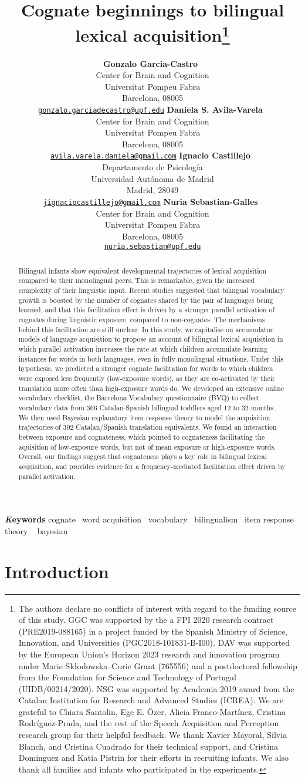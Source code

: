 \documentclass[
]{article}
\title{Cognate beginnings to bilingual lexical acquisition\thanks{The
authors declare no conflicts of interest with regard to the funding
source of this study. GGC was supported by the a FPI 2020 research
contract (PRE2019-088165) in a project funded by the Spanish Ministry of
Science, Innovation, and Universities (PGC2018-101831-B-I00). DAV was
supported by the European Union's Horizon 2023 research and innovation
program under Marie Skłodowska--Curie Grant (765556) and a postdoctoral
fellowship from the Foundation for Science and Technology of Portugal
(UIDB/00214/2020). NSG was supported by Academia 2019 award from the
Catalan Institution for Research and Advanced Studies (ICREA). We are
grateful to Chiara Santolin, Ege E. Özer, Alicia Franco-Martínez,
Cristina Rodríguez-Prada, and the rest of the Speech Acquisition and
Perception research group for their helpful feedback. We thank Xavier
Mayoral, Silvia Blanch, and Cristina Cuadrado for their technical
support, and Cristina Dominguez and Katia Pistrin for their efforts in
recruiting infants. We also thank all families and infants who
participated in the experiments.}}
\author{
\textbf{Gonzalo Garcia-Castro}~\orcidlink{0000-0002-8553-4209}\\Center
for Brain and Cognition\\Universitat Pompeu Fabra\\Barcelona,
08005\\\texttt{\href{mailto:gonzalo.garciadecastro@upf.edu}{gonzalo.garciadecastro@upf.edu}}\And
\textbf{Daniela S. Avila-Varela}~\orcidlink{0000-0002-3518-8117}\\Center
for Brain and Cognition\\Universitat Pompeu Fabra\\Barcelona,
08005\\\texttt{\href{mailto:avila.varela.daniela@gmail.com}{avila.varela.daniela@gmail.com}}\And
\textbf{Ignacio
Castillejo}~\orcidlink{0000-0001-7445-0416}\\Departamento de
Psicología\\Universidad Autónoma de Madrid\\Madrid,
28049\\\texttt{\href{mailto:jignaciocastillejo@gmail.com}{jignaciocastillejo@gmail.com}}\And
\textbf{Nuria Sebastian-Galles}~\orcidlink{0000-0001-6938-2498}\\Center
for Brain and Cognition\\Universitat Pompeu Fabra\\Barcelona,
08005\\\texttt{\href{mailto:nuria.sebastian@upf.edu}{nuria.sebastian@upf.edu}}}
\date{}
\begin{document}
\maketitle
\begin{abstract}
Bilingual infants show equivalent developmental trajectories of lexical
acquisition compared to their monolingual peers. This is remarkable,
given the increased complexity of their linguistic input. Recent studies
suggested that bilingual vocabulary growth is boosted by the number of
cognates shared by the pair of languages being learned, and that this
facilitation effect is driven by a stronger parallel activation of
cognates during linguistic exposure, compared to non-cognates. The
mechanisms behind this facilitation are still unclear. In this study, we
capitalise on accumulator models of language acquisition to propose an
account of bilingual lexical acquisition in which parallel activation
increases the rate at which children accumulate learning instances for
words in both languages, even in fully monolingual situations. Under
this hypothesis, we predicted a stronger cognate facilitation for words
to which children were exposed less frequently (low-exposure words), as
they are co-activated by their translation more often than high-exposure
words do. We developed an extensive online vocabulary checklist, the
Barcelona Vocabulary questionnaire (BVQ) to collect vocabulary data from
366 Catalan-Spanish bilingual toddlers aged 12 to 32 months. We then
used Bayesian explanatory item response theory to model the acquisition
trajectories of 302 Catalan/Spanish translation equivalents. We found an
interaction between exposure and cognateness, which pointed to
cognateness facilitating the aquisition of low-exposure words, but not
of mean exposure or high-exposure words. Overall, our findings suggest
that cognateness plays a key role in bilingual lexical acquisition, and
provides evidence for a frequency-mediated facilitation effect driven by
parallel activation.
\end{abstract}
{\bfseries \emph Keywords}
\def\sep{\textbullet\ }
cognate \sep word
acquisition \sep vocabulary \sep bilingualism \sep item response
theory \sep 
bayesian

\ifdefined\Shaded\renewenvironment{Shaded}{\begin{tcolorbox}[enhanced, sharp corners, borderline west={3pt}{0pt}{shadecolor}, frame hidden, breakable, interior hidden, boxrule=0pt]}{\end{tcolorbox}}\fi

\hypertarget{introduction}{%
\section{Introduction}\label{introduction}}
\end{document}
